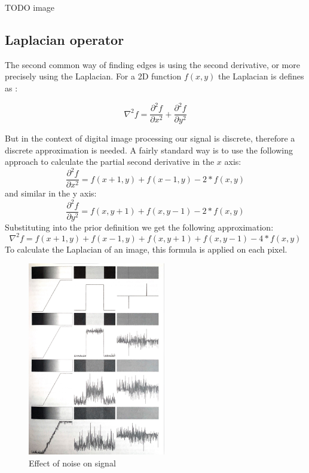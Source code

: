 \documentclass[
  digital,     %
  oneside,     %
  nosansbold,  %
  nocolorbold, %
  lof,         %
  lot,         %
]{fithesis4}
\begin{document}
TODO image

\subsection{Laplacian operator}

The second common way of finding edges is using the second derivative, or more
precisely using the Laplacian. For a 2D function $f(x, y)$ the Laplacian is
defines as \parencite{gonzalez2002}:

$$\nabla^2 f = \frac{\partial^2 f}{\partial x^2} + \frac{\partial^2 f}{\partial y^2}$$

But in the context of digital image processing our signal is discrete, therefore
a discrete approximation is needed. A fairly standard way is to use the
following approach to calculate the partial second derivative in the $x$ axis:
$$\frac{\partial^2 f}{\partial x^2} = f(x + 1, y) + f(x - 1, y) - 2*f(x, y)$$
and similar in the y axis:
$$\frac{\partial^2 f}{\partial y^2} = f(x, y + 1) + f(x, y - 1) - 2*f(x, y)$$
Substituting into the prior definition we get the following approximation:
$$\nabla^2 f = f(x+1, y) + f(x-1, y) + f(x, y+1) + f(x, y-1) - 4*f(x,y)$$
To calculate the Laplacian of an image, this formula is applied on each pixel.


\begin{figure}
    \begin{center}
        \includegraphics[width=6cm]{"resources/gonzalez_edges_and_noise.jpg"}
    \end{center}
    \caption{Effect of noise on signal \parencite{gonzalez2002}}
    \label{fig:edges_noise}
\end{figure}
\end{document}
